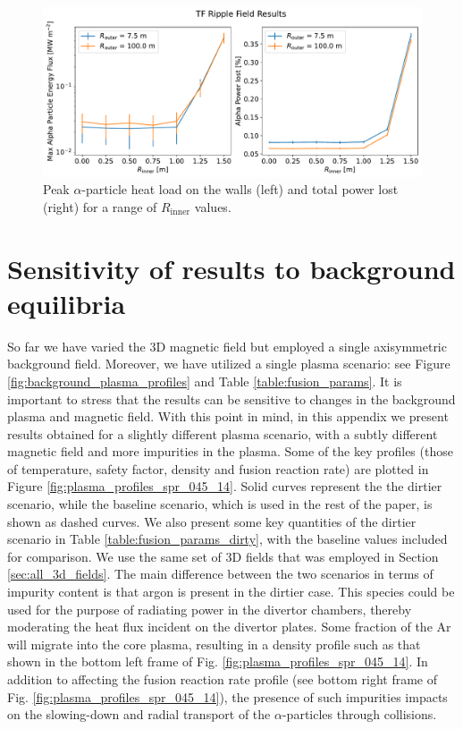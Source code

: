 \documentclass[10pt, a4paper, twoside]{article}
\begin{document}
\begin{figure}[!ht]
    \centering
    \includegraphics[width=0.99\linewidth]{Figures/max_and_total_energy_flux_vs_rcoil_inner.pdf}
    \caption{Peak $\alpha$-particle heat load on the walls (left) and total power lost (right) for a range of \( R_\text{inner} \) values.}
    \label{fig:max_and_total_energy_flux_vs_rcoil_inner}
\end{figure}

\section{Sensitivity of results to background equilibria}
\label{appendix:sensitivity_of_results_to_background_equillibria}

So far we have varied the 3D magnetic field but employed a single axisymmetric background field. Moreover, we have utilized a single plasma scenario: see Figure \ref{fig:background_plasma_profiles} and Table \ref{table:fusion_params}. It is important to stress that the results can be sensitive to changes in the background plasma and magnetic field. With this point in mind, in this appendix we present results obtained for a slightly different plasma scenario, with a subtly different magnetic field and more impurities in the plasma. Some of the key profiles (those of temperature, safety factor, density and fusion reaction rate) are plotted in Figure \ref{fig:plasma_profiles_spr_045_14}. Solid curves represent the the dirtier scenario, while the baseline scenario, which is used in the rest of the paper, is shown as dashed curves. We also present some key quantities of the dirtier scenario in Table \ref{table:fusion_params_dirty}, with the baseline values included for comparison. We use the same set of 3D fields that was employed in Section \ref{sec:all_3d_fields}. The main difference between the two scenarios in terms of impurity content is that argon is present in the dirtier case. This species could be used for the purpose of radiating power in the divertor chambers, thereby moderating the heat flux incident on the divertor plates. Some fraction of the Ar will migrate into the core plasma, resulting in a density profile such as that shown in the bottom left frame of Fig. \ref{fig:plasma_profiles_spr_045_14}. In addition to affecting the fusion reaction rate profile (see bottom right frame of Fig. \ref{fig:plasma_profiles_spr_045_14}), the presence of such impurities impacts on the slowing-down and radial transport of the $\alpha$-particles through collisions.       
\end{document}
